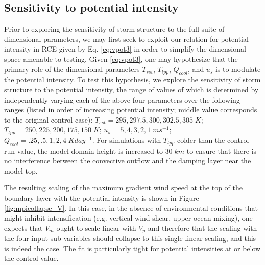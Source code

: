 \documentclass[12pt]{article}
\begin{document}
\subsection{Sensitivity to potential intensity}
Prior to exploring the sensitivity of storm structure to the full suite of dimensional parameters, we may first seek to exploit our relation for potential intensity in RCE given by Eq. \eqref{eq:vpot3} in order to simplify the dimensional space amenable to testing. Given \eqref{eq:vpot3}, one may hypothesize that the primary role of the dimensional parameters $T_{sst}$, $T_{tpp}$, $Q_{cool}$, and $u_s$ is to modulate the potential intensity. To test this hypothesis, we explore the sensitivity of storm structure to the potential intensity, the range of values of which is determined by independently varying each of the above four parameters over the following ranges (listed in order of increasing potential intensity; middle value corresponds to the original control case): $T_{sst} = 295, 297.5, 300, 302.5, 305 \; K$; $T_{tpp} = 250, 225, 200, 175, 150 \; K$; $u_s = 5, 4, 3, 2, 1 \; ms^{-1}$; $Q_{cool} = .25, .5, 1, 2, 4 \; K day^{-1}$.  For simulations with $T_{tpp}$ colder than the control run value, the model domain height is increased to $30 \; km$ to ensure that there is no interference between the convective outflow and the damping layer near the model top.

The resulting scaling of the maximum gradient wind speed at the top of the boundary layer with the potential intensity is shown in Figure \ref{fig:mpicollapse_V}.  In this case, in the absence of environmental conditions that might inhibit intensification (e.g. vertical wind shear, upper ocean mixing), one expects that $V_m$ ought to scale linear with $V_p$ and therefore that the scaling with the four input sub-variables should collapse to this single linear scaling, and this is indeed the case.  The fit is particularly tight for potential intensities at or below the control value.
\end{document}

